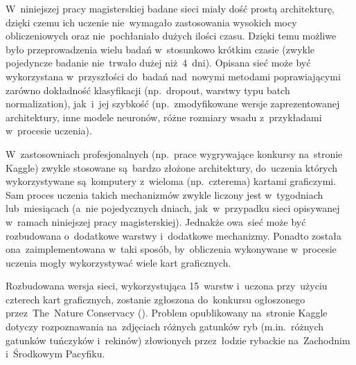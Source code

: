 W~niniejszej pracy magisterskiej badane sieci miały dość prostą architekturę, dzięki czemu ich uczenie nie~wymagało
zastosowania wysokich mocy obliczeniowych oraz nie~pochłaniało dużych ilości czasu. Dzięki temu możliwe było
przeprowadzenia wielu badań w~stosunkowo krótkim czasie (zwykle pojedyncze badanie nie~trwało dużej niż~4~dni).
Opisana sieć może być wykorzystana w~przyszłości do~badań nad~nowymi metodami poprawiającymi zarówno dokładność
klasyfikacji (np.~dropout, warstwy typu batch normalization), jak~i~jej szybkość (np.~zmodyfikowane wersje
zaprezentowanej architektury, inne modele neuronów, różne rozmiary wsadu z~przykładami w~procesie uczenia).

W~zastosowniach profesjonalnych (np.~prace wygrywające konkursy na~stronie Kaggle) zwykle stosowane są~bardzo złożone
architektury, do~uczenia których wykorzystywane są~komputery z~wieloma (np.~czterema) kartami graficzymi. Sam proces
uczenia takich mechanizmów zwykle liczony jest w~tygodniach lub~miesiącach (a~nie pojedycznych dniach, jak~w~przypadku
sieci opisywanej w~ramach niniejszej pracy magisterskiej). Jednakże owa~sieć może być rozbudowana o~dodatkowe warstwy
i~dodatkowe mechanizmy. Ponadto została ona~zaimplementowana w~taki sposób, by~obliczenia wykonywane w~procesie uczenia
mogły wykorzystywać wiele kart graficznych.

Rozbudowana wersja sieci, wykorzystująca 15~warstw i~uczona przy~użyciu czterech kart graficznych, zostanie zgłoszona
do~konkursu ogłoszonego przez~The~Nature Conservacy (\cite{nature-conservacy}). Problem opublikowany na~stronie Kaggle
dotyczy rozpoznawania na~zdjęciach różnych gatunków ryb (m.in.~różnych gatunków tuńczyków i~rekinów) złowionych
przez~łodzie rybackie na~Zachodnim i~Środkowym Pacyfiku.